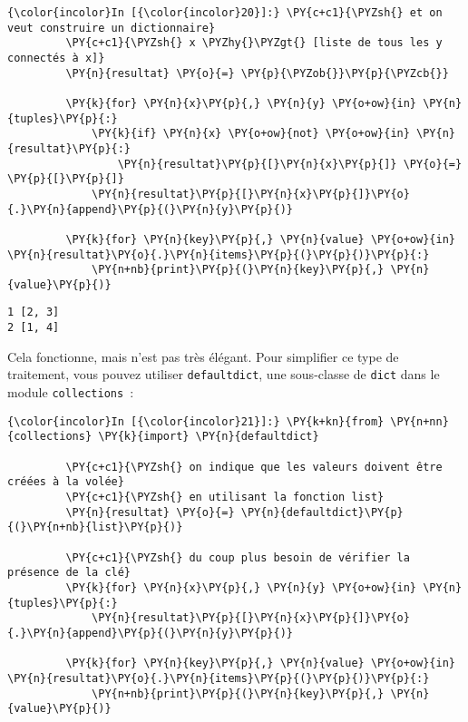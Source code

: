     \begin{Verbatim}[commandchars=\\\{\},frame=single,framerule=0.3mm,rulecolor=\color{cellframecolor}]
{\color{incolor}In [{\color{incolor}20}]:} \PY{c+c1}{\PYZsh{} et on veut construire un dictionnaire}
         \PY{c+c1}{\PYZsh{} x \PYZhy{}\PYZgt{} [liste de tous les y connectés à x]}
         \PY{n}{resultat} \PY{o}{=} \PY{p}{\PYZob{}}\PY{p}{\PYZcb{}}
         
         \PY{k}{for} \PY{n}{x}\PY{p}{,} \PY{n}{y} \PY{o+ow}{in} \PY{n}{tuples}\PY{p}{:}
             \PY{k}{if} \PY{n}{x} \PY{o+ow}{not} \PY{o+ow}{in} \PY{n}{resultat}\PY{p}{:}
                 \PY{n}{resultat}\PY{p}{[}\PY{n}{x}\PY{p}{]} \PY{o}{=} \PY{p}{[}\PY{p}{]}
             \PY{n}{resultat}\PY{p}{[}\PY{n}{x}\PY{p}{]}\PY{o}{.}\PY{n}{append}\PY{p}{(}\PY{n}{y}\PY{p}{)}
         
         \PY{k}{for} \PY{n}{key}\PY{p}{,} \PY{n}{value} \PY{o+ow}{in} \PY{n}{resultat}\PY{o}{.}\PY{n}{items}\PY{p}{(}\PY{p}{)}\PY{p}{:}
             \PY{n+nb}{print}\PY{p}{(}\PY{n}{key}\PY{p}{,} \PY{n}{value}\PY{p}{)}
\end{Verbatim}


    \begin{Verbatim}[commandchars=\\\{\},frame=single,framerule=0.3mm,rulecolor=\color{cellframecolor}]
1 [2, 3]
2 [1, 4]
\end{Verbatim}

    Cela fonctionne, mais n'est pas très élégant. Pour simplifier ce type de
traitement, vous pouvez utiliser \texttt{defaultdict}, une sous-classe
de \texttt{dict} dans le module \texttt{collections}~:

    \begin{Verbatim}[commandchars=\\\{\},frame=single,framerule=0.3mm,rulecolor=\color{cellframecolor}]
{\color{incolor}In [{\color{incolor}21}]:} \PY{k+kn}{from} \PY{n+nn}{collections} \PY{k}{import} \PY{n}{defaultdict}
         
         \PY{c+c1}{\PYZsh{} on indique que les valeurs doivent être créées à la volée}
         \PY{c+c1}{\PYZsh{} en utilisant la fonction list}
         \PY{n}{resultat} \PY{o}{=} \PY{n}{defaultdict}\PY{p}{(}\PY{n+nb}{list}\PY{p}{)}
         
         \PY{c+c1}{\PYZsh{} du coup plus besoin de vérifier la présence de la clé}
         \PY{k}{for} \PY{n}{x}\PY{p}{,} \PY{n}{y} \PY{o+ow}{in} \PY{n}{tuples}\PY{p}{:}
             \PY{n}{resultat}\PY{p}{[}\PY{n}{x}\PY{p}{]}\PY{o}{.}\PY{n}{append}\PY{p}{(}\PY{n}{y}\PY{p}{)}
         
         \PY{k}{for} \PY{n}{key}\PY{p}{,} \PY{n}{value} \PY{o+ow}{in} \PY{n}{resultat}\PY{o}{.}\PY{n}{items}\PY{p}{(}\PY{p}{)}\PY{p}{:}
             \PY{n+nb}{print}\PY{p}{(}\PY{n}{key}\PY{p}{,} \PY{n}{value}\PY{p}{)}
\end{Verbatim}


